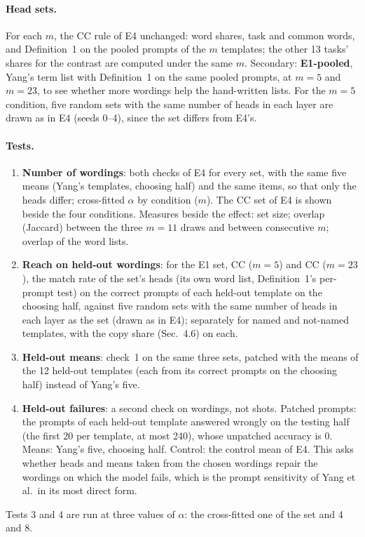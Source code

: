 \paragraph{Head sets.} For each $m$, the CC rule of E4 unchanged: word shares, task and
common words, and Definition~1 on the pooled prompts of the $m$ templates; the other 13
tasks' shares for the contrast are computed under the same $m$. Secondary: \textbf{E1-pooled},
Yang's term list with Definition~1 on the same pooled prompts, at $m = 5$ and $m = 23$, to see
whether more wordings help the hand-written lists. For the $m = 5$ condition, five random sets
with the same number of heads in each layer are drawn as in E4 (seeds 0--4), since the set
differs from E4's.

\paragraph{Tests.}
\begin{enumerate}
  \item \textbf{Number of wordings}: both checks of E4 for every set, with the same five means
    (Yang's templates, choosing half) and the same items, so that only the heads differ;
    cross-fitted $\alpha$ by condition ($m$). The CC set of E4 is shown beside the four
    conditions. Measures beside the effect: set size; overlap
    (Jaccard) between the three $m = 11$ draws and between consecutive $m$; overlap of the
    word lists.
  \item \textbf{Reach on held-out wordings}: for the E1 set, CC ($m = 5$) and CC ($m = 23$),
    the match rate of the set's heads (its own word list, Definition~1's per-prompt test) on the
    correct prompts of each held-out template on the choosing half, against five random sets
    with the same number of heads in each layer as the set (drawn as in E4); separately for
    named and not-named templates, with the copy share (Sec.~4.6) on each.
  \item \textbf{Held-out means}: check~1 on the same three sets, patched with the means of the
    12 held-out templates (each from its correct prompts on the choosing half) instead of
    Yang's five.
  \item \textbf{Held-out failures}: a second check on wordings, not shots. Patched prompts:
    the prompts of each held-out template answered wrongly on the testing half (the first 20
    per template, at most 240), whose unpatched accuracy is 0. Means: Yang's five, choosing
    half. Control: the control mean of E4. This asks whether heads and means taken from the
    chosen wordings repair the wordings on which the model fails, which is the prompt
    sensitivity of Yang et al.\ in its most direct form.
\end{enumerate}
Tests 3 and 4 are run at three values of $\alpha$: the cross-fitted one of the set and 4 and 8.

